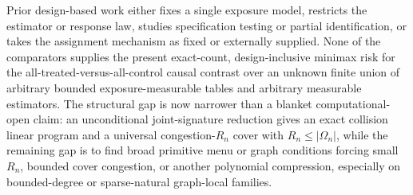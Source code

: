 Prior design-based work either fixes a single exposure model, restricts the estimator or response law, studies specification testing or partial identification, or takes the assignment mechanism as fixed or externally supplied. None of the comparators supplies the present exact-count, design-inclusive minimax risk for the all-treated-versus-all-control causal contrast over an unknown finite union of arbitrary bounded exposure-measurable tables and arbitrary measurable estimators. The structural gap is now narrower than a blanket computational-open claim: an unconditional joint-signature reduction gives an exact collision linear program and a universal congestion-\(R_n\) cover with \(R_n\le|\Omega_n|\), while the remaining gap is to find broad primitive menu or graph conditions forcing small \(R_n\), bounded cover congestion, or another polynomial compression, especially on bounded-degree or sparse-natural graph-local families.